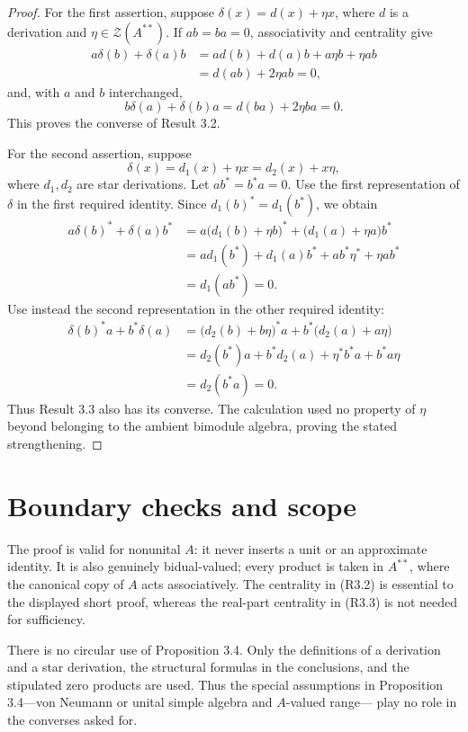 \documentclass[11pt]{article}
\newcommand{\Z}{\mathcal Z}
\begin{document}
\begin{proof}
For the first assertion, suppose $\delta(x)=d(x)+\eta x$, where $d$ is a
derivation and $\eta\in\Z(A^{**})$.  If $ab=ba=0$, associativity and
centrality give
\begin{align*}
 a\delta(b)+\delta(a)b
 &=ad(b)+d(a)b+a\eta b+\eta ab\\
 &=d(ab)+2\eta ab=0,
\end{align*}
and, with $a$ and $b$ interchanged,
\[
 b\delta(a)+\delta(b)a=d(ba)+2\eta ba=0.
\]
This proves the converse of Result 3.2.

For the second assertion, suppose
\[
 \delta(x)=d_1(x)+\eta x=d_2(x)+x\eta,
\]
where $d_1,d_2$ are star derivations.  Let $ab^*=b^*a=0$.  Use the first
representation of $\delta$ in the first required identity.  Since
$d_1(b)^*=d_1(b^*)$, we obtain
\begin{align*}
 a\delta(b)^*+\delta(a)b^*
 &=a\bigl(d_1(b)+\eta b\bigr)^*
   +\bigl(d_1(a)+\eta a\bigr)b^*\\
 &=ad_1(b^*)+d_1(a)b^*+ab^*\eta^*+\eta ab^*\\
 &=d_1(ab^*)=0.
\end{align*}
Use instead the second representation in the other required identity:
\begin{align*}
 \delta(b)^*a+b^*\delta(a)
 &=\bigl(d_2(b)+b\eta\bigr)^*a
   +b^*\bigl(d_2(a)+a\eta\bigr)\\
 &=d_2(b^*)a+b^*d_2(a)+\eta^*b^*a+b^*a\eta\\
 &=d_2(b^*a)=0.
\end{align*}
Thus Result 3.3 also has its converse.  The calculation used no property of
$\eta$ beyond belonging to the ambient bimodule algebra, proving the stated
strengthening.
\end{proof}

\section{Boundary checks and scope}

The proof is valid for nonunital $A$: it never inserts a unit or an
approximate identity.  It is also genuinely bidual-valued; every product is
taken in $A^{**}$, where the canonical copy of $A$ acts associatively.  The
centrality in (R3.2) is essential to the displayed short proof, whereas the
real-part centrality in (R3.3) is not needed for sufficiency.

There is no circular use of Proposition 3.4.  Only the definitions of a
derivation and a star derivation, the structural formulas in the conclusions,
and the stipulated zero products are used.  Thus the special assumptions in
Proposition 3.4---von Neumann or unital simple algebra and $A$-valued range---
play no role in the converses asked for.
\end{document}
